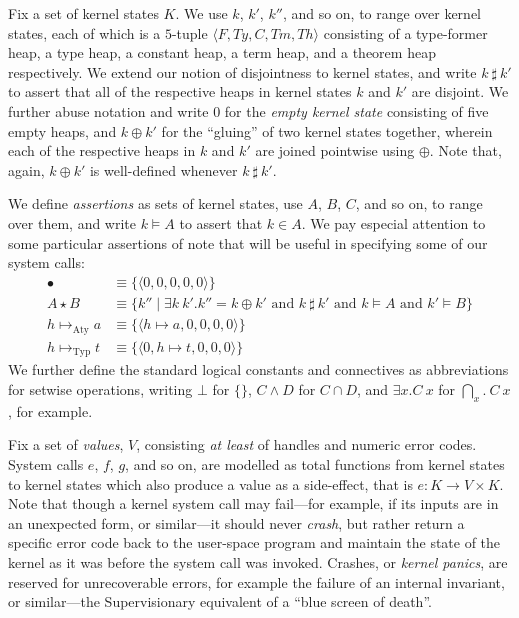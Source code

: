 \documentclass[a4paper, UKenglish, cleveref, autoref, thm-restate, colorlinks]{lipics-v2021}
\newcommand{\xsts}[1]{\exists{#1}.}
\begin{document}
Fix a set of kernel states $K$.
We use $k$, $k'$, $k''$, and so on, to range over kernel states, each of which is a $5$-tuple $\langle F, Ty, C, Tm, Th \rangle$ consisting of a type-former heap, a type heap, a constant heap, a term heap, and a theorem heap respectively.
We extend our notion of disjointness to kernel states, and write $k\ \sharp\ k'$ to assert that all of the respective heaps in kernel states $k$ and $k'$ are disjoint.
We further abuse notation and write $0$ for the \emph{empty kernel state} consisting of five empty heaps, and $k \oplus k'$ for the ``gluing'' of two kernel states together, wherein each of the respective heaps in $k$ and $k'$ are joined pointwise using $\oplus$.
Note that, again, $k \oplus k'$ is well-defined whenever $k\ \sharp\ k'$.

We define \emph{assertions} as sets of kernel states, use $A$, $B$, $C$, and so on, to range over them, and write $k \vDash A$ to assert that $k \in A$.
We pay especial attention to some particular assertions of note that will be useful in specifying some of our system calls:
\begin{align*}
\bullet                  &\equiv \{ \langle 0, 0, 0, 0, 0 \rangle \} \\
A \star B                &\equiv \{ k'' \mid \xsts{k\ k'}k'' = k \oplus k' \text{ and } k\ \sharp\ k' \text{ and } k \vDash A \text{ and } k' \vDash B \} \\
h \mapsto_{\text{Aty}} a &\equiv \{ \langle h \mapsto a, 0, 0, 0, 0 \rangle \} \\
h \mapsto_{\text{Typ}} t &\equiv \{ \langle 0, h \mapsto t, 0, 0, 0 \rangle \}
\end{align*}
We further define the standard logical constants and connectives as abbreviations for setwise operations, writing $\bot$ for $\{\}$, $C \wedge D$ for $C \cap D$, and $\xsts{x}C\ x$ for $\bigcap_x.\ C\ x$, for example.

Fix a set of \emph{values}, $V$, consisting \emph{at least} of handles and numeric error codes.
System calls $e$, $f$, $g$, and so on, are modelled as total functions from kernel states to kernel states which also produce a value as a side-effect, that is $e : K \rightarrow V \times K$.
Note that though a kernel system call may fail---for example, if its inputs are in an unexpected form, or similar---it should never \emph{crash}, but rather return a specific error code back to the user-space program and maintain the state of the kernel as it was before the system call was invoked.
Crashes, or \emph{kernel panics}, are reserved for unrecoverable errors, for example the failure of an internal invariant, or similar---the Supervisionary equivalent of a ``blue screen of death''.
\end{document}
